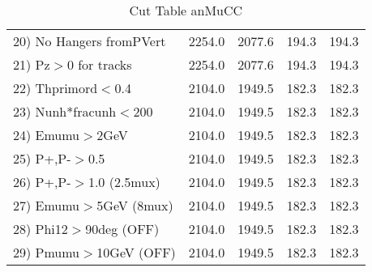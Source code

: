 \begin{table}[h!]
\begin{tabular}{||l||r|r|r|r||}
 20) No Hangers fromPVert &      2254.0 &      2077.6 &       194.3 &       194.3 \\
 21) Pz$>$0 for tracks    &      2254.0 &      2077.6 &       194.3 &       194.3 \\
 22) Thprimord$<$0.4      &      2104.0 &      1949.5 &       182.3 &       182.3 \\
 23) Nunh*fracunh$<$200   &      2104.0 &      1949.5 &       182.3 &       182.3 \\
 24) Emumu$>$2GeV         &      2104.0 &      1949.5 &       182.3 &       182.3 \\
 25) P+,P-$>$0.5          &      2104.0 &      1949.5 &       182.3 &       182.3 \\
 26) P+,P-$>$1.0 (2.5mux) &      2104.0 &      1949.5 &       182.3 &       182.3 \\
 27) Emumu$>$5GeV  (8mux) &      2104.0 &      1949.5 &       182.3 &       182.3 \\
 28) Phi12$>$90deg  (OFF) &      2104.0 &      1949.5 &       182.3 &       182.3 \\
 29) Pmumu$>$10GeV  (OFF) &      2104.0 &      1949.5 &       182.3 &       182.3 \\
 \hline
 \hline
 \end{tabular}
 \caption{Cut Table  anMuCC }
 \label{tab-cut_anmcc}
 \end{table}
